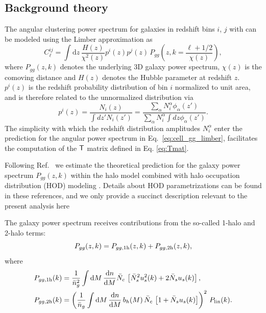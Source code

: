 \documentclass[a4paper,11pt]{article}
\begin{document}
    \subsection{Background theory}\label{ssec:hsc.theory}
      The angular clustering power spectrum for galaxies in redshift bins $i$, $j$ with can be modeled using the Limber approximation as \cite{1953ApJ...117..134L, 1992ApJ...388..272K, Kaiser:1998}
      \begin{equation}\label{eq:cell_gg_limber}
        C^{ij}_\ell = \int \mathrm{d}z\,\frac{H(z)}{\chi^2(z)} p^i(z)p^j(z)\,P_{gg}\left(z,k=\frac{\ell+1/2}{\chi(z)}\right),
      \end{equation}
      where $P_{gg}(z,k)$ denotes the underlying 3D galaxy power spectrum, $\chi(z)$ is the comoving distance and $H(z)$ denotes the Hubble parameter at redshift $z$. $p^i(z)$ is the redshift probability distribution of bin $i$ normalized to unit area, and is therefore related to the unnormalized distribution via
      \begin{equation}
        p^i(z)=\frac{N_i(z)}{\int dz' N_i(z')}=\frac{\sum_\alpha N^\alpha_i\phi_\alpha(z')}{\sum_\alpha N^\alpha_i\int dz\phi_\alpha(z')}.
      \end{equation}
      The simplicity with which the redshift distribution amplitudes $N_i^\alpha$ enter the prediction for the angular power spectrum in Eq.~\ref{eq:cell_gg_limber}, facilitates the computation of the ${\sf T}$ matrix defined in Eq. \ref{eq:Tmat}. 

      Following Ref.~\cite{1912.08209} we estimate the theoretical prediction for the galaxy power spectrum $P_{gg}(z,k)$ within the halo model combined with halo occupation distribution (HOD) modeling \cite{2000MNRAS.318.1144P,2002PhR...372....1C,2002ApJ...575..587B,2005ApJ...633..791Z,2013MNRAS.430..725V}. Details about HOD parametrizations can be found in these references, and we only provide a succinct description relevant to the present analysis here

      The galaxy power spectrum receives contributions from the so-called 1-halo and 2-halo terms:
      \begin{equation}
        P_{gg}(z,k) = P_{gg,{\rm 1h}}(z,k) + P_{gg,{\rm 2h}}(z,k),
      \end{equation}
      where
      \begin{align}
        & P_{gg,{\rm 1h}}(k)=\frac{1}{\bar{n}_g^2} \int \mathrm{d}M\,\frac{\mathrm{d}n}{\mathrm{d}M} \bar{N}_c\,\left[\bar{N}_s^2u_s^2(k)+2\bar{N}_su_s(k)\right],\\
        & P_{gg,{\rm 2h}}(k)=\left(\frac{1}{\bar{n}_g} \int \mathrm{d}M\,\frac{\mathrm{d}n}{\mathrm{d}M}\,b_h(M)\,\bar{N}_c\,\left[1+\bar{N}_su_s(k)\right]\right)^2\,P_{\rm lin}(k).
      \end{align}
    
\end{document}

